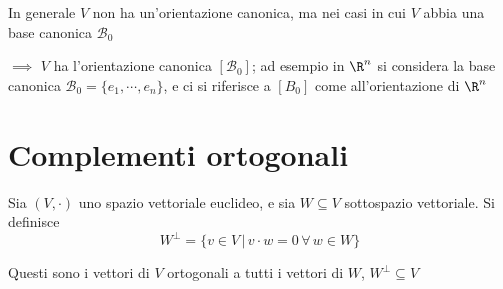 In generale $ V $ non ha un'orientazione canonica, ma nei casi in cui $ V $ abbia una base canonica $ \mathscr{B}_0 $ 

$\implies$ $ V $ ha l'orientazione canonica $ [ \mathscr{B}_0] $; ad esempio in $ \R^{n} $ si considera la base canonica $ \mathscr{B}_0=\{e_1,\cdots,e_{n} \} $, e ci si riferisce a $ [B_{0} ] $ come all'orientazione di $ \R^{n} $

\section{Complementi ortogonali}

Sia $ (V, \cdot ) $ uno spazio vettoriale euclideo, e sia $ W \subseteq V $ sottospazio vettoriale. Si definisce \[ W^{\bot }=\{v \in V\,|\, v \cdot w = 0 \, \forall\, w \in W\}\]

Questi sono i vettori di $ V $ ortogonali a tutti i vettori di $ W$, $ W^{\bot} \subseteq V $


